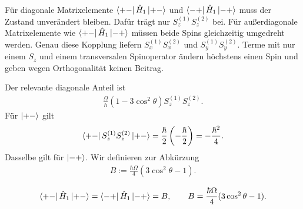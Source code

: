 \documentclass[11pt,a4paper]{scrartcl}
\newcommand{\op}[1]{\hat{#1}}
\begin{document}
\begin{enumerate}[label=(\alph*)]
\begin{calculationbox}
            \begin{calculationbox}[title=Warum genau diese Terme beitragen]
                Für diagonale Matrixelemente $\bra{+-}\op H_1\ket{+-}$ und $\bra{-+}\op H_1\ket{-+}$ muss der Zustand unverändert bleiben. Dafür trägt nur $S_z^{(1)}S_z^{(2)}$ bei. Für außerdiagonale Matrixelemente wie $\bra{+-}\op H_1\ket{-+}$ müssen beide Spins gleichzeitig umgedreht werden. Genau diese Kopplung liefern $S_x^{(1)}S_x^{(2)}$ und $S_y^{(1)}S_y^{(2)}$. Terme mit nur einem $S_z$ und einem transversalen Spinoperator ändern höchstens einen Spin und geben wegen Orthogonalität keinen Beitrag.
            \end{calculationbox}

            \begin{calculationbox}[title=Diagonale Matrixelemente]
                Der relevante diagonale Anteil ist
                \begin{align*}
                    \frac{\Omega}{\hbar}(1-3\cos^2\theta)S_z^{(1)}S_z^{(2)}.
                \end{align*}
                Für $\ket{+-}$ gilt
                \begin{align*}
                    \bra{+-}S_z^{(1)}S_z^{(2)}\ket{+-}
                    =
                    \frac{\hbar}{2}\left(-\frac{\hbar}{2}\right)
                    =
                    -\frac{\hbar^2}{4}.
                \end{align*}
                Dasselbe gilt für $\ket{-+}$. Wir definieren zur Abkürzung
                \begin{align*}
                    B:=\frac{\hbar\Omega}{4}(3\cos^2\theta-1).
                \end{align*}

                \begin{solutionbox}[title=Diagonale Matrixelemente]
                    \begin{align*}
                        \bra{+-}\op H_1\ket{+-}
                        =
                        \bra{-+}\op H_1\ket{-+}
                        =
                        B,
                        \qquad
                        B=\frac{\hbar\Omega}{4}(3\cos^2\theta-1).
                    \end{align*}
                \end{solutionbox}
            \end{calculationbox}


\end{calculationbox}
\end{enumerate}
\end{document}
